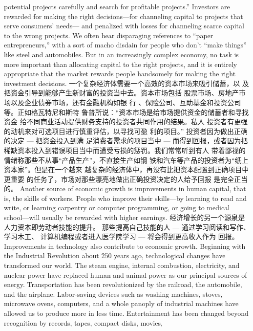 \begin{paracol}{2}
potential projects carefully and search for profitable projects.''
Investors are rewarded for making the right decisions---for
channeling capital to projects that serve consumers' needs---
and penalized with losses for channeling scarce capital to the
wrong projects. We often hear disparaging references to ``paper
entrepreneurs,'' with a sort of macho disdain for people who
don't ``make things'' like steel and automobiles. But in an increasingly complex economy, no task is more important than allocating capital to the right projects, and it is entirely
appropriate that the market rewards people handsomely for
making the right investment decisions.
\switchcolumn
一个复杂经济体需要一个高效的资本市场来吸引储蓄，以
及把资金引导到能够产生新财富的投资当中去。资本市场包括
股票市场、房地产市场以及企业债券市场，还有金融机构如银
行 、保险公司、互助基金和投资公司等。正如格瓦特尼和斯特
鲁普所说：“资本市场是给市场提供资金的储蓄者和寻找资金
给不同商业活动提供财务支持的投资者共同作用的结果。私人
投资者有更强的动机来对可选项目进行慎重评估，以寻找可盈
利的项目。” 投资者因为做出正确的决定 --- 把资金投入到满
足消费者需求的项目当中 --- 而得到回报，或者因为把稀缺资本投入到错误项目当中而遭受亏损的惩罚。我们常常听到有人
带着鄙视的情绪称那些不从事“产品生产”，不直接生产如钢
铁和汽车等产品的投资者为“纸上资本家”。但是在一个越来
越复杂的经济体中，再没有比把资本配置到正确项目中更重要
的任务了，市场对那些漂亮地做出正确投资决定的人给予回报
是完全正当的。
\switchcolumn*
Another source of economic growth is improvements in
human capital, that is, the skills of workers. People who improve their skills---by learning to read and write, or learning
carpentry or computer programming, or going to medical
school---will usually be rewarded with higher earnings.
\switchcolumn
经济增长的另一个源泉是人力资本即劳动者技能的提升。
那些提高自己技能的人 --- 通过学习阅读和写作、学习木工、
计算机编程或者进入医学院学习 --- 将会得到更高收入作为
回报。
\switchcolumn*
Improvements in technology also contribute to economic
growth. Beginning with the Industrial Revolution about 250
years ago, technological changes have transformed our world.
The steam engine, internal combustion, electricity, and nuclear
power have replaced human and animal power as our principal
sources of energy. Transportation has been revolutionized by the
railroad, the automobile, and the airplane. Labor-saving devices
such as washing machines, stoves, microwave ovens, computers, and a whole panoply of industrial machines have allowed us
to produce more in less time. Entertainment has been changed
beyond recognition by records, tapes, compact disks, movies,

\end{paracol}
